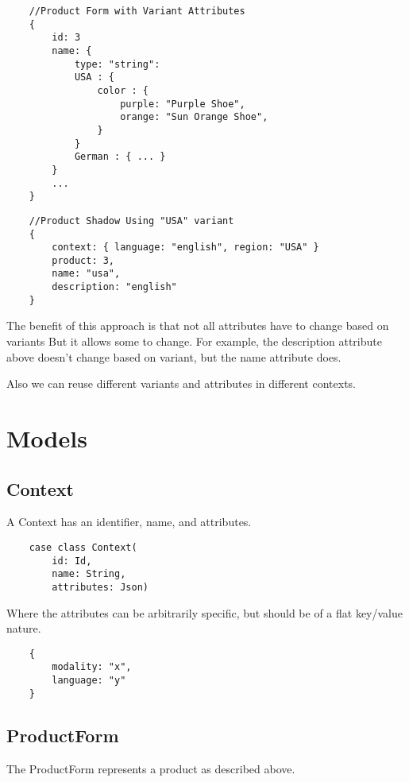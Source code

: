 \documentclass[11pt]{article}
\begin{document}
\begin{lstlisting}
    //Product Form with Variant Attributes
    {
        id: 3
        name: { 
            type: "string": 
            USA : {  
                color : {
                    purple: "Purple Shoe", 
                    orange: "Sun Orange Shoe", 
                }
            }
            German : { ... }
        }
        ...
    }
\end{lstlisting}

\begin{lstlisting}
    //Product Shadow Using "USA" variant
    {
        context: { language: "english", region: "USA" }
        product: 3,
        name: "usa",
        description: "english"
    }
\end{lstlisting}

The benefit of this approach is that not all attributes have to change based on variants
But it allows some to change. For example, the description attribute above doesn't
change based on variant, but the name attribute does.

Also we can reuse different variants and attributes in different contexts.

\section{Models}

\subsection{Context}

A Context has an identifier, name, and attributes. 
\begin{lstlisting}
    case class Context(
        id: Id,
        name: String,
        attributes: Json)
\end{lstlisting}

Where the attributes can be arbitrarily specific, but should be of a flat key/value nature.

\begin{lstlisting}
    {
        modality: "x",
        language: "y"
    }
\end{lstlisting}


\subsection{ProductForm}

The ProductForm represents a product as described above. 
\end{document}

